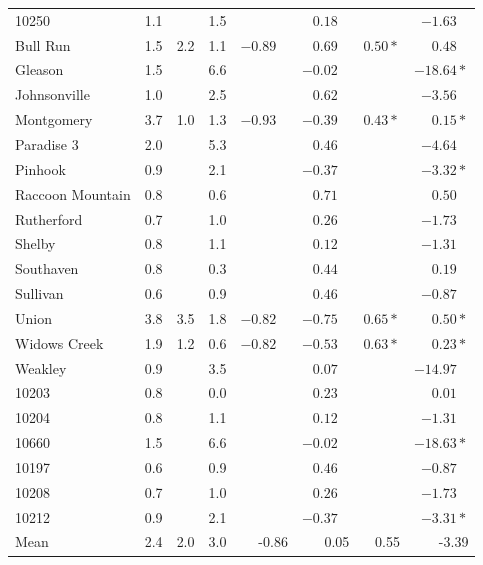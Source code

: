 \begin{tabular}{l r r r r r r r}
10250 & 1.1 &  & 1.5 &  & $0.18\phantom{*}$ &  & $-1.63\phantom{*}$ \\
Bull Run & 1.5 & 2.2 & 1.1 & $-0.89\phantom{*}$ & $0.69\phantom{*}$ & $0.50*$ & $0.48\phantom{*}$ \\
Gleason & 1.5 &  & 6.6 &  & $-0.02\phantom{*}$ &  & $-18.64*$ \\
Johnsonville & 1.0 &  & 2.5 &  & $0.62\phantom{*}$ &  & $-3.56\phantom{*}$ \\
Montgomery & 3.7 & 1.0 & 1.3 & $-0.93\phantom{*}$ & $-0.39\phantom{*}$ & $0.43*$ & $0.15*$ \\
Paradise 3 & 2.0 &  & 5.3 &  & $0.46\phantom{*}$ &  & $-4.64\phantom{*}$ \\
Pinhook & 0.9 &  & 2.1 &  & $-0.37\phantom{*}$ &  & $-3.32*$ \\
Raccoon Mountain & 0.8 &  & 0.6 &  & $0.71\phantom{*}$ &  & $0.50\phantom{*}$ \\
Rutherford & 0.7 &  & 1.0 &  & $0.26\phantom{*}$ &  & $-1.73\phantom{*}$ \\
Shelby & 0.8 &  & 1.1 &  & $0.12\phantom{*}$ &  & $-1.31\phantom{*}$ \\
Southaven & 0.8 &  & 0.3 &  & $0.44\phantom{*}$ &  & $0.19\phantom{*}$ \\
Sullivan & 0.6 &  & 0.9 &  & $0.46\phantom{*}$ &  & $-0.87\phantom{*}$ \\
Union & 3.8 & 3.5 & 1.8 & $-0.82\phantom{*}$ & $-0.75\phantom{*}$ & $0.65*$ & $0.50*$ \\
Widows Creek & 1.9 & 1.2 & 0.6 & $-0.82\phantom{*}$ & $-0.53\phantom{*}$ & $0.63*$ & $0.23*$ \\
Weakley & 0.9 &  & 3.5 &  & $0.07\phantom{*}$ &  & $-14.97\phantom{*}$ \\
10203 & 0.8 &  & 0.0 &  & $0.23\phantom{*}$ &  & $0.01\phantom{*}$ \\
10204 & 0.8 &  & 1.1 &  & $0.12\phantom{*}$ &  & $-1.31\phantom{*}$ \\
10660 & 1.5 &  & 6.6 &  & $-0.02\phantom{*}$ &  & $-18.63*$ \\
10197 & 0.6 &  & 0.9 &  & $0.46\phantom{*}$ &  & $-0.87\phantom{*}$ \\
10208 & 0.7 &  & 1.0 &  & $0.26\phantom{*}$ &  & $-1.73\phantom{*}$ \\
10212 & 0.9 &  & 2.1 &  & $-0.37\phantom{*}$ &  & $-3.31*$ \\
\hline
Mean & 2.4 & 2.0 & 3.0 & -0.86 & 0.05 & 0.55 & -3.39 \\
\end{tabular}

